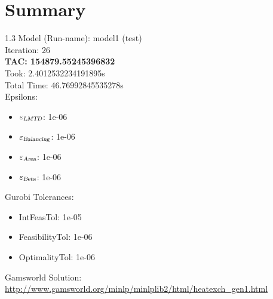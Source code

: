 \documentclass{article}%
\begin{document}
%
\normalsize%
\section{Summary}%
\thispagestyle{plain}%
\begin{spacing}{1.3}%
\Large%
Model (Run-name): model1 (test)\\%
Iteration: 26\\%
\textbf{TAC: 154879.55245396832}\\%
Took: 2.4012532234191895s\\%
Total Time: 46.76992845535278s\\%
Epsilons:%
\begin{itemize}%
	\item $\varepsilon_{\textsl{LMTD}}$: 1e-06%
	\item $\varepsilon_{\textsl{Balancing}}$: 1e-06%
	\item $\varepsilon_{\textsl{Area}}$: 1e-06%
	\item $\varepsilon_{\textsl{Beta}}$: 1e-06%
\end{itemize}%
Gurobi Tolerances:%
\begin{itemize}%
	\item IntFeasTol: 1e-05%
	\item FeasibilityTol: 1e-06%
	\item OptimalityTol: 1e-06%
\end{itemize}%
\end{spacing}%
\normalsize%
Gamsworld Solution: \url{http://www.gamsworld.org/minlp/minlplib2/html/heatexch_gen1.html}%
%
\clearpage%
\end{document}

